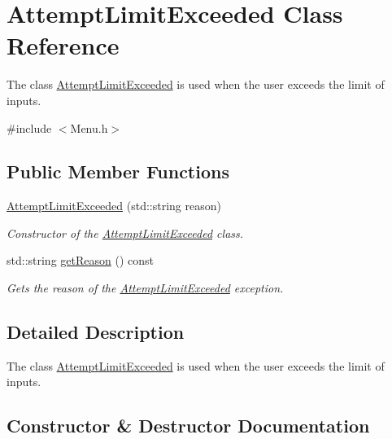 \hypertarget{class_attempt_limit_exceeded}{}\section{Attempt\+Limit\+Exceeded Class Reference}
\label{class_attempt_limit_exceeded}


The class \hyperlink{class_attempt_limit_exceeded}{Attempt\+Limit\+Exceeded} is used when the user exceeds the limit of inputs.  




{\ttfamily \#include $<$Menu.\+h$>$}

\subsection*{Public Member Functions}
\begin{DoxyCompactItemize}
\item 
\hyperlink{class_attempt_limit_exceeded_ab91e2037be9e83fd0575c362a7660e8a}{Attempt\+Limit\+Exceeded} (std\+::string reason)
\begin{DoxyCompactList}\small\item\em Constructor of the \hyperlink{class_attempt_limit_exceeded}{Attempt\+Limit\+Exceeded} class. \end{DoxyCompactList}\item 
std\+::string \hyperlink{class_attempt_limit_exceeded_afe5d477bcdf5a7c0c606c466c770a1d4}{get\+Reason} () const 
\begin{DoxyCompactList}\small\item\em Gets the reason of the \hyperlink{class_attempt_limit_exceeded}{Attempt\+Limit\+Exceeded} exception. \end{DoxyCompactList}\end{DoxyCompactItemize}


\subsection{Detailed Description}
The class \hyperlink{class_attempt_limit_exceeded}{Attempt\+Limit\+Exceeded} is used when the user exceeds the limit of inputs. 

\subsection{Constructor \& Destructor Documentation}
